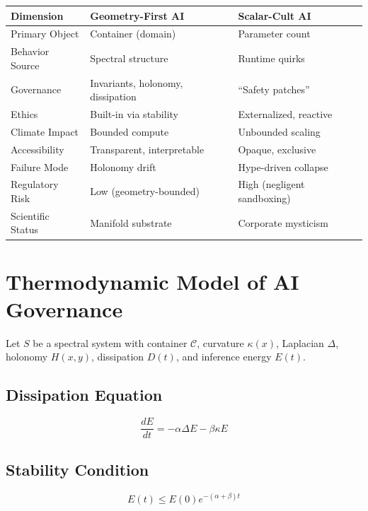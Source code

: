 \documentclass[11pt]{article}
\begin{document}
\begin{table}[h!]
\centering
\begin{tabular}{lll}
\toprule
\textbf{Dimension} & \textbf{Geometry-First AI} & \textbf{Scalar-Cult AI} \\
\midrule
Primary Object & Container (domain) & Parameter count \\
Behavior Source & Spectral structure & Runtime quirks \\
Governance & Invariants, holonomy, dissipation & ``Safety patches'' \\
Ethics & Built-in via stability & Externalized, reactive \\
Climate Impact & Bounded compute & Unbounded scaling \\
Accessibility & Transparent, interpretable & Opaque, exclusive \\
Failure Mode & Holonomy drift & Hype-driven collapse \\
Regulatory Risk & Low (geometry-bounded) & High (negligent sandboxing) \\
Scientific Status & Manifold substrate & Corporate mysticism \\
\bottomrule
\end{tabular}
\end{table}

\section{Thermodynamic Model of AI Governance}

Let $S$ be a spectral system with container $\mathcal{C}$, curvature $\kappa(x)$, Laplacian $\Delta$, holonomy $H(x,y)$, dissipation $D(t)$, and inference energy $E(t)$.

\subsection{Dissipation Equation}

\begin{equation}
\frac{dE}{dt} = -\alpha \Delta E - \beta \kappa E
\end{equation}

\subsection{Stability Condition}

\begin{equation}
E(t) \leq E(0)e^{-(\alpha + \beta)t}
\end{equation}
\end{document}
